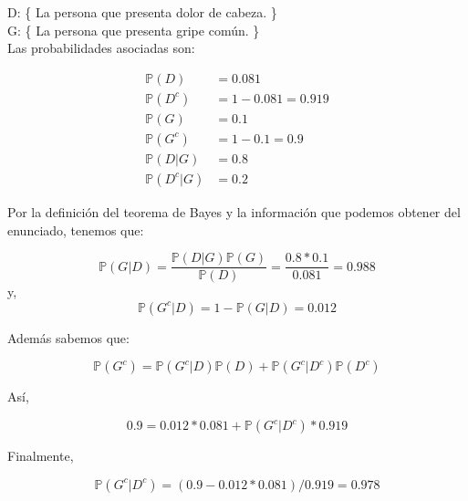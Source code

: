 \begin{solution}
D: \{ La persona que presenta dolor de cabeza. \}\\

G: \{ La persona que presenta gripe común. \}\\


Las probabilidades asociadas son:

\begin{align*}
\mathbb{P}(D)&=0.081\\
\mathbb{P}(D^c)&=1-0.081=0.919\\
\mathbb{P}(G)&=0.1\\
\mathbb{P}(G^c)&=1-0.1=0.9\\
\mathbb{P}(D|G)&=0.8\\
\mathbb{P}(D^c|G)&=0.2
\end{align*}

Por la definición del teorema de Bayes y la información que podemos obtener del enunciado, tenemos que:

$$\mathbb{P}(G|D)=\frac{\mathbb{P}(D|G) \mathbb{P}(G)}{\mathbb{P}(D)} =\dfrac{0.8*0.1}{0.081}=0.988 $$
y,
$$\mathbb{P}(G^c|D)=1-\mathbb{P}(G|D)=0.012$$

Además sabemos que:

$$\mathbb{P}(G^c)= \mathbb{P}(G^c|D)\mathbb{P}(D) + \mathbb{P}(G^c|D^c)\mathbb{P}(D^c)$$

Así,

$$0.9=0.012*0.081 + \mathbb{P}(G^c|D^c)*0.919$$

Finalmente,

$$\mathbb{P}(G^c|D^c)=(0.9-0.012*0.081)/0.919=0.978$$

\end{solution}